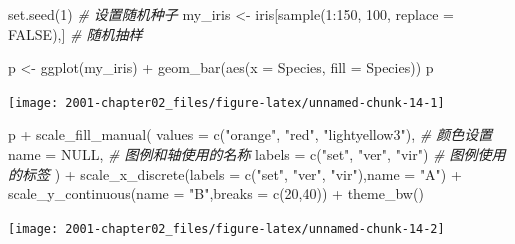 \documentclass[
]{book}
\newenvironment{Shaded}{\begin{snugshade}}{\end{snugshade}}
\newcommand{\AttributeTok}[1]{\textcolor[rgb]{0.77,0.63,0.00}{#1}}
\newcommand{\CommentTok}[1]{\textcolor[rgb]{0.56,0.35,0.01}{\textit{#1}}}
\newcommand{\ConstantTok}[1]{\textcolor[rgb]{0.00,0.00,0.00}{#1}}
\newcommand{\DecValTok}[1]{\textcolor[rgb]{0.00,0.00,0.81}{#1}}
\newcommand{\FunctionTok}[1]{\textcolor[rgb]{0.00,0.00,0.00}{#1}}
\newcommand{\NormalTok}[1]{#1}
\newcommand{\OtherTok}[1]{\textcolor[rgb]{0.56,0.35,0.01}{#1}}
\newcommand{\SpecialCharTok}[1]{\textcolor[rgb]{0.00,0.00,0.00}{#1}}
\newcommand{\StringTok}[1]{\textcolor[rgb]{0.31,0.60,0.02}{#1}}
\begin{document}
\begin{Shaded}
\begin{Highlighting}[]
\FunctionTok{set.seed}\NormalTok{(}\DecValTok{1}\NormalTok{)  }\CommentTok{\# 设置随机种子}
\NormalTok{my\_iris }\OtherTok{\textless{}{-}}\NormalTok{ iris[}\FunctionTok{sample}\NormalTok{(}\DecValTok{1}\SpecialCharTok{:}\DecValTok{150}\NormalTok{, }\DecValTok{100}\NormalTok{, }\AttributeTok{replace =} \ConstantTok{FALSE}\NormalTok{),]  }\CommentTok{\# 随机抽样}

\NormalTok{p }\OtherTok{\textless{}{-}} \FunctionTok{ggplot}\NormalTok{(my\_iris) }\SpecialCharTok{+} 
  \FunctionTok{geom\_bar}\NormalTok{(}\FunctionTok{aes}\NormalTok{(}\AttributeTok{x =}\NormalTok{ Species, }\AttributeTok{fill =}\NormalTok{ Species))}
\NormalTok{p}
\end{Highlighting}
\end{Shaded}

\begin{center}\texttt{[image: 2001-chapter02\_files/figure-latex/unnamed-chunk-14-1]} \end{center}

\begin{Shaded}
\begin{Highlighting}[]
\NormalTok{p }\SpecialCharTok{+} \FunctionTok{scale\_fill\_manual}\NormalTok{(}
    \AttributeTok{values =} \FunctionTok{c}\NormalTok{(}\StringTok{"orange"}\NormalTok{, }\StringTok{"red"}\NormalTok{, }\StringTok{"lightyellow3"}\NormalTok{),  }\CommentTok{\# 颜色设置}
    \AttributeTok{name =} \ConstantTok{NULL}\NormalTok{,  }\CommentTok{\# 图例和轴使用的名称}
    \AttributeTok{labels =} \FunctionTok{c}\NormalTok{(}\StringTok{"set"}\NormalTok{, }\StringTok{"ver"}\NormalTok{, }\StringTok{"vir"}\NormalTok{)  }\CommentTok{\# 图例使用的标签}
\NormalTok{)  }\SpecialCharTok{+} 
  \FunctionTok{scale\_x\_discrete}\NormalTok{(}\AttributeTok{labels =} \FunctionTok{c}\NormalTok{(}\StringTok{"set"}\NormalTok{, }\StringTok{"ver"}\NormalTok{, }\StringTok{"vir"}\NormalTok{),}\AttributeTok{name =} \StringTok{"A"}\NormalTok{) }\SpecialCharTok{+}
  \FunctionTok{scale\_y\_continuous}\NormalTok{(}\AttributeTok{name =} \StringTok{"B"}\NormalTok{,}\AttributeTok{breaks =} \FunctionTok{c}\NormalTok{(}\DecValTok{20}\NormalTok{,}\DecValTok{40}\NormalTok{)) }\SpecialCharTok{+}
  \FunctionTok{theme\_bw}\NormalTok{()}
\end{Highlighting}
\end{Shaded}

\begin{center}\texttt{[image: 2001-chapter02\_files/figure-latex/unnamed-chunk-14-2]} \end{center}
\end{document}

